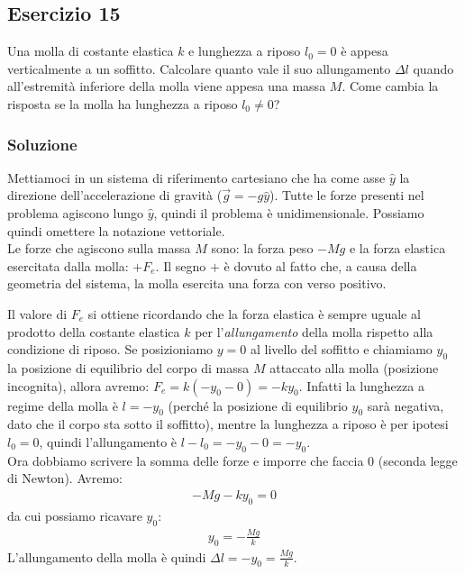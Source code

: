 \documentclass[12pt,a4paper]{book}
\begin{document}
\subsection*{Esercizio 15}
Una molla di costante elastica $k$ e lunghezza a riposo $l_0=0$ è appesa verticalmente a un soffitto. 
Calcolare quanto vale il suo allungamento $\Delta l$ quando all'estremità inferiore della molla viene appesa
una massa $M$. Come cambia la risposta se la molla ha lunghezza a riposo $l_0 \neq 0$? 

\subsubsection*{Soluzione}
Mettiamoci in un sistema di riferimento cartesiano che ha come asse $\hat{y}$ la direzione dell'accelerazione di gravità ($\vec{g}=-g\hat{y}$). Tutte le forze presenti nel problema agiscono lungo $\hat{y}$, quindi il problema è unidimensionale. Possiamo quindi omettere la notazione vettoriale.\\

Le forze che agiscono sulla massa $M$ sono: la forza peso $-Mg$ e la forza elastica esercitata dalla molla: $+F_e$.
Il segno $+$ è dovuto al fatto che, a causa della geometria del sistema, la molla esercita una forza con verso positivo. 

Il valore di $F_e$ si ottiene ricordando che la forza elastica è sempre uguale al prodotto della costante elastica $k$ per l'\textit{allungamento}  della molla rispetto alla condizione di riposo. Se posizioniamo $y=0$ al livello del soffitto e chiamiamo $y_0$ la posizione di equilibrio del corpo di massa $M$ attaccato alla molla (posizione incognita), allora avremo: $F_e=k(-y_0-0)=-ky_0$. Infatti la lunghezza 
a regime della molla è $l=-y_0$  (perché la posizione di equilibrio $y_0$ sarà negativa, dato che il corpo sta sotto il soffitto), mentre la lunghezza a riposo è per ipotesi $l_0=0$, quindi l'allungamento è $l-l_0=-y_0-0=-y_0$.\\

Ora dobbiamo scrivere la somma delle forze e imporre che faccia $0$ (seconda legge di Newton). Avremo:
\begin{gather*}
-Mg-ky_0=0
\end{gather*}
da cui possiamo ricavare $y_0$:
\begin{gather*}
y_0=-\frac{Mg}{k}
\end{gather*}
L'allungamento della molla è quindi $\Delta l=-y_0=\frac{Mg}{k}$. \\
\end{document}
